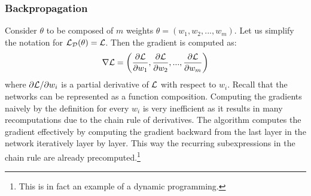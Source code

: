 \subsubsection{Backpropagation}
Consider $\theta$ to be composed of $m$ weights $\theta = (w_1, w_2, ..., w_m)$.
Let us simplify the notation for $\mathcal{L}_\mathcal{D}(\theta) = \mathcal{L}$. Then the
gradient is computed as:
$$
    \grad = \left(\pd{1}, \pd{2}, ..., \pd{m}\right)
$$
where $\partial \mathcal{L} / \partial w_i$ is a partial derivative of $\mathcal{L}$ with
respect to $w_i$. Recall that the networks can be represented as a function
composition. Computing the gradients naively by the definition for every $w_i$
is very inefficient as it results in many recomputations due to the chain rule
of derivatives. The  algorithm \cite{backprop} computes the
gradient effectively by computing the gradient backward from the last layer in
the network iteratively layer by layer. This way the recurring subexpressions in
the chain rule are already precomputed.\footnote{This is in fact an example of a
    dynamic programming.}



